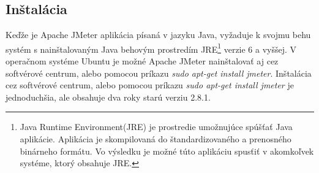 \documentclass[12pt,oneside,final]{fithesis-utf8}
\begin{document}
\subsection{Inštalácia}
Keďže je Apache JMeter aplikácia písaná v jazyku Java, vyžaduje k svojmu behu systém s nainštalovaným Java behovým prostredím JRE\footnote{Java Runtime Environment(JRE) je prostredie umožnujúce spúšťať Java aplikácie. Aplikácia je skompilovaná do štandardizovaného a prenosného binárneho formátu. Vo výsledku je možné túto aplikáciu spusťiť v akomkoľvek systéme, ktorý obsahuje JRE.} verzie 6 a vyššej. V operačnom systéme Ubuntu je možné Apache JMeter nainštalovať aj cez softvérové centrum, alebo pomocou príkazu \textit{sudo apt-get install jmeter}. Inštalácia cez softvérové centrum, alebo pomocou príkazu \textit{sudo apt-get install jmeter} je jednoduchšia, ale obsahuje dva roky starú verziu 2.8.1.
\end{document}
